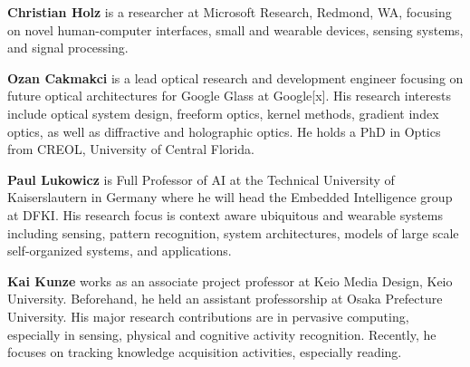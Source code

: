 \documentclass{sigchi-ext}
\begin{document}
{\bf Christian Holz} is a researcher at Microsoft Research, Redmond, WA, focusing on novel human-computer interfaces, small and wearable devices, sensing systems, and signal processing.

{\bf Ozan Cakmakci} is a lead optical research and development engineer focusing on future optical architectures for Google Glass at Google[x]. His research interests include optical system design, freeform optics, kernel methods, gradient index optics, as well as diffractive and holographic optics. He holds a PhD in Optics from CREOL, University of Central Florida.

{\bf Paul Lukowicz} is Full Professor of AI at the Technical University of Kaiserslautern in Germany where he will head the Embedded Intelligence group at DFKI. His research focus is context aware ubiquitous and wearable systems including sensing, pattern recognition, system architectures, models of large scale self-organized systems, and applications.

{\bf Kai Kunze} works as an associate project professor at Keio Media Design, Keio University. Beforehand, he held an assistant professorship at Osaka Prefecture University.  His major research contributions are in pervasive computing, especially in sensing, physical and cognitive activity recognition. Recently, he focuses on tracking knowledge acquisition activities, especially reading.



\balance{} 



\end{document}
